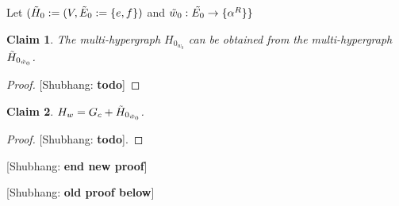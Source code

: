 \documentclass{article}
\newtheorem{claim}{Claim}[section]
\newcommand{\shubhang}[1]{{\color{blue}[{\tiny Shubhang: \bf #1}]\marginpar{\color{blue}*}}}
\begin{document}
    Let $(\Tilde{H}_0 := (V, \Tilde{E}_0 :=\{e, f\})$ and $\Tilde{w}_0 : \Tilde{E_0} \rightarrow\{ \alpha^R\}\}$ 
    \begin{claim}
        The multi-hypergraph $H_{0_{w_0}}$ can be obtained from the multi-hypergraph $\Tilde{H}_{0_{\Tilde{w}_0}}$.
    \end{claim}
    \begin{proof}
        \shubhang{todo}
    \end{proof}

    \begin{claim}
        $H_w = G_c + \Tilde{H}_{0_{\Tilde{w}_0}}$.
    \end{claim}
    \begin{proof}
        \shubhang{todo}.
    \end{proof}

\shubhang{end new proof}
    
\shubhang{old proof below}
\end{document}
